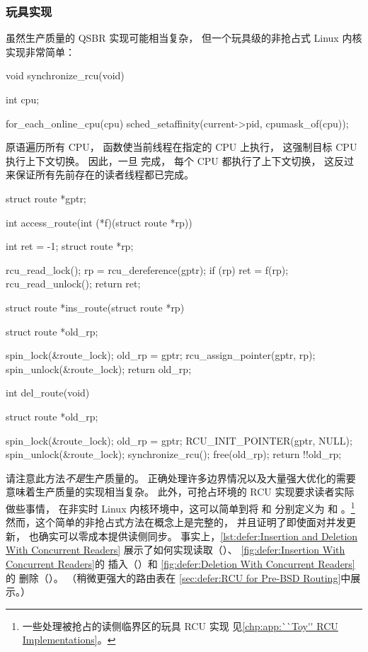 \subsubsection{玩具实现}
\label{sec:defer:Toy Implementation}

虽然生产质量的 QSBR 实现可能相当复杂，
但一个玩具级的非抢占式 Linux 内核实现非常简单：

\begin{VerbatimN}[samepage=true]
void synchronize_rcu(void)
{
	int cpu;

	for_each_online_cpu(cpu)
		sched_setaffinity(current->pid, cpumask_of(cpu));
}
\end{VerbatimN}

 原语遍历所有 CPU，
 函数使当前线程在指定的 CPU 上执行，
这强制目标 CPU 执行上下文切换。
因此，一旦  完成，
每个 CPU 都执行了上下文切换，
这反过来保证所有先前存在的读者线程都已完成。

\begin{listing}
\begin{fcvlabel}
\begin{VerbatimL}[commandchars=\\\[\]]
struct route *gptr;

int access_route(int (*f)(struct route *rp))
{
	int ret = -1;
	struct route *rp;

	rcu_read_lock();
	rp = rcu_dereference(gptr);
	if (rp)
		ret = f(rp);		\lnlbl[access_rp]
	rcu_read_unlock();
	return ret;
}

struct route *ins_route(struct route *rp)
{
	struct route *old_rp;

	spin_lock(&route_lock);
	old_rp = gptr;
	rcu_assign_pointer(gptr, rp);
	spin_unlock(&route_lock);
	return old_rp;
}

int del_route(void)
{
	struct route *old_rp;

	spin_lock(&route_lock);
	old_rp = gptr;
	RCU_INIT_POINTER(gptr, NULL);
	spin_unlock(&route_lock);
	synchronize_rcu();
	free(old_rp);
	return !!old_rp;
}
\end{VerbatimL}
\end{fcvlabel}
\caption{并发读者下的插入和删除}
\label{lst:defer:Insertion and Deletion With Concurrent Readers}
\end{listing}

请注意此方法\emph{不是}生产质量的。
正确处理许多边界情况以及大量强大优化的需要
意味着生产质量的实现相当复杂。
此外，可抢占环境的 RCU 实现要求读者实际做些事情，
在非实时 Linux 内核环境中，这可以简单到将
 和 
分别定义为  和 。\footnote{
	一些处理被抢占的读侧临界区的玩具 RCU 实现
	见\cref{chp:app:``Toy'' RCU Implementations}\@。}
然而，这个简单的非抢占式方法在概念上是完整的，
并且证明了即使面对并发更新，
也确实可以零成本提供读侧同步。
事实上，\cref{lst:defer:Insertion and Deletion With Concurrent Readers}
展示了如何实现读取（）、
\cref{fig:defer:Insertion With Concurrent Readers}的
插入（）和
\cref{fig:defer:Deletion With Concurrent Readers}的
删除（）。
（稍微更强大的路由表在
\cref{sec:defer:RCU for Pre-BSD Routing}中展示。）

